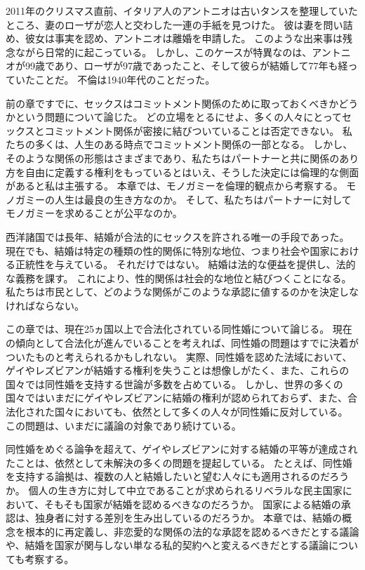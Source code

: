 \documentclass[paper=a4,book,openany]{jlreq}
\begin{document}
2011年のクリスマス直前、イタリア人のアントニオは古いタンスを整理していたところ、妻のローザが恋人と交わした一連の手紙を見つけた。
彼は妻を問い詰め、彼女は事実を認め、アントニオは離婚を申請した。
このような出来事は残念ながら日常的に起こっている。
しかし、このケースが特異なのは、アントニオが99歳であり、ローザが97歳であったこと、そして彼らが結婚して77年も経っていたことだ。
不倫は1940年代のことだった\citep{squires11:_divor_wife_he_discov_affair}。

前の章ですでに、セックスはコミットメント関係のために取っておくべきかどうかという問題について論じた。
どの立場をとるにせよ、多くの人々にとってセックスとコミットメント関係が密接に結びついていることは否定できない。
私たちの多くは、人生のある時点でコミットメント関係の一部となる。
しかし、そのような関係の形態はさまざまであり、私たちはパートナーと共に関係のあり方を自由に定義する権利をもっているとはいえ、そうした決定には倫理的な側面があると私は主張する。
本章では、モノガミーを倫理的観点から考察する。
モノガミーの人生は最良の生き方なのか。
そして、私たちはパートナーに対してモノガミーを求めることが公平なのか。

西洋諸国では長年、結婚が合法的にセックスを許される唯一の手段であった。
現在でも、結婚は特定の種類の性的関係に特別な地位、つまり社会や国家における正統性を与えている。
それだけではない。
結婚は法的な便益を提供し、法的な義務を課す。
これにより、性的関係は社会的な地位と結びつくことになる。
私たちは市民として、どのような関係がこのような承認に値するのかを決定しなければならない。

この章では、現在25ヵ国以上で合法化されている同性婚について論じる。
現在の傾向として合法化が進んでいることを考えれば、同性婚の問題はすでに決着がついたものと考えられるかもしれない。
実際、同性婚を認めた法域において、ゲイやレズビアンが結婚する権利を失うことは想像しがたく、また、これらの国々では同性婚を支持する世論が多数を占めている。
しかし、世界の多くの国々ではいまだにゲイやレズビアンに結婚の権利が認められておらず、また、合法化された国々においても、依然として多くの人々が同性婚に反対している。
この問題は、いまだに議論の対象であり続けている。

同性婚をめぐる論争を超えて、ゲイやレズビアンに対する結婚の平等が達成されたことは、依然として未解決の多くの問題を提起している。
たとえば、同性婚を支持する論拠は、複数の人と結婚したいと望む人々にも適用されるのだろうか。
個人の生き方に対して中立であることが求められるリベラルな民主国家において、そもそも国家が結婚を認めるべきなのだろうか。
国家による結婚の承認は、独身者に対する差別を生み出しているのだろうか。
本章では、結婚の概念を根本的に再定義し、非恋愛的な関係の法的な承認を認めるべきだとする議論や、結婚を国家が関与しない単なる私的契約へと変えるべきだとする議論についても考察する。
\end{document}
